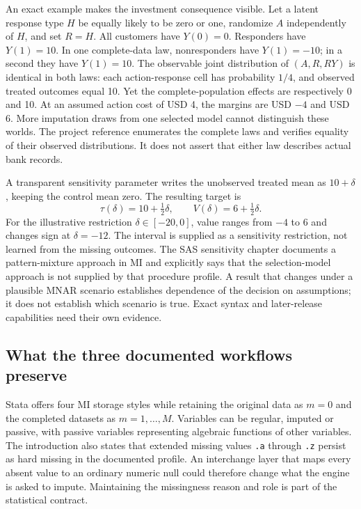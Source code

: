 An exact example makes the investment consequence visible. Let a latent response
type $H$ be equally likely to be zero or one, randomize $A$ independently of
$H$, and set $R=H$. All customers have $Y(0)=0$. Responders have $Y(1)=10$.
In one complete-data law, nonresponders have $Y(1)=-10$; in a second they have
$Y(1)=10$. The observable joint distribution of $(A,R,RY)$ is identical in
both laws: each action-response cell has probability $1/4$, and observed treated
outcomes equal 10. Yet the complete-population effects are respectively 0 and
10. At an assumed action cost of USD 4, the margins are USD $-4$ and USD 6.
More imputation draws from one selected model cannot distinguish these worlds.
The project reference enumerates the complete laws and verifies equality of
their observed distributions. It does not assert that either law describes
actual bank records. \cite{exec21_transport_reference}

A transparent sensitivity parameter writes the unobserved treated mean as
$10+\delta$, keeping the control mean zero. The resulting target is
\begin{equation}
 \tau(\delta)=10+\tfrac12\delta,\qquad
 V(\delta)=6+\tfrac12\delta.
 \label{exec21:transport-sensitivity}
\end{equation}
For the illustrative restriction $\delta\in[-20,0]$, value ranges from $-4$
to 6 and changes sign at $\delta=-12$. The interval is supplied as a sensitivity
restriction, not learned from the missing outcomes. The SAS sensitivity chapter
documents a pattern-mixture approach in MI and explicitly says that the
selection-model approach is not supplied by that procedure profile. A result
that changes under a plausible MNAR scenario establishes dependence of the
decision on assumptions; it does not establish which scenario is true. Exact
syntax and later-release capabilities need their own evidence.
\cite{exec21_transport_sas_sensitivity,exec21_transport_reference}

\subsection{What the three documented workflows preserve}
\label{exec21:transport-workflows}

Stata offers four MI storage styles while retaining the original data as
$m=0$ and the completed datasets as $m=1,\ldots,M$. Variables can be regular,
imputed or passive, with passive variables representing algebraic functions
of other variables. The introduction also states that extended missing values
\texttt{.a} through \texttt{.z} persist as hard missing in the documented
profile. An interchange layer that maps every absent value to an ordinary
numeric null could therefore change what the engine is asked to impute.
Maintaining the missingness reason and role is part of the statistical contract.
\cite{exec21_transport_stata_mi}

